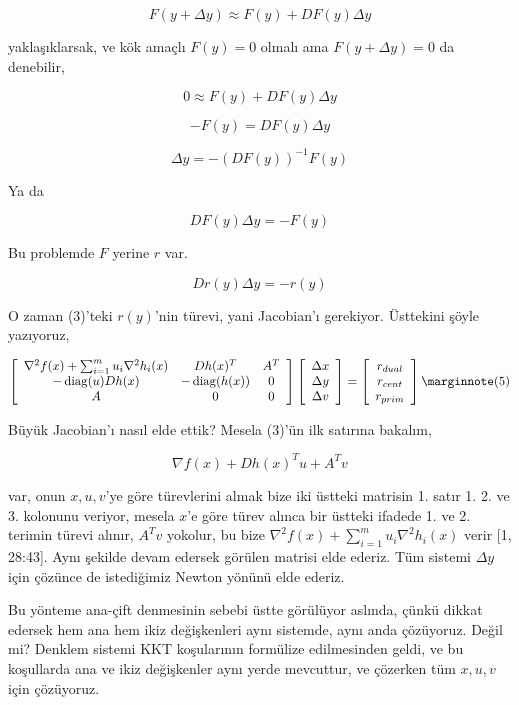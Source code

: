 \documentclass[12pt,fleqn]{article}\usepackage{../../common}
\begin{document}
$$
F(y + \Delta y) \approx F(y) + D F(y) \Delta y
$$

yaklaşıklarsak, ve kök amaçlı $F(y)=0$ olmalı ama $F(y + \Delta y) = 0$ da
denebilir,

$$
0 \approx F(y) + D F(y) \Delta y
$$

$$
-F(y) =  D F(y) \Delta y
$$

$$
\Delta y = -(DF(y))^{-1} F(y) 
$$

Ya da

$$
DF(y) \Delta y = -F(y) 
$$

Bu problemde $F$ yerine $r$ var. 

$$
D r(y) \Delta y = -r(y) 
$$

O zaman (3)'teki $r(y)$'nin türevi, yani Jacobian'ı gerekiyor. Üsttekini
şöyle yazıyoruz, 

$$
\left[\begin{array}{ccc}
\nabla^2 f(x) + \sum_{i=1}^{m} u_i \nabla^2 h_i(x) & D h(x)^T & A^T \\
-\diag(u) D h(x) & -\diag(h(x)) & 0 \\
A & 0 & 0
\end{array}\right]
\left[\begin{array}{c}
\Delta x \\ \Delta y \\ \Delta v
\end{array}\right] = 
\left[\begin{array}{c}
r_{dual} \\ r_{cent} \\ r_{prim}
\end{array}\right]  
\mlabel{5}
$$

Büyük Jacobian'ı nasıl elde ettik? Mesela (3)'ün ilk satırına bakalım, 

$$
\nabla f(x) + Dh(x)^T u + A^T v 
$$

var, onun $x,u,v$'ye göre türevlerini almak bize iki üstteki matrisin
1. satır 1. 2. ve 3. kolonunu veriyor, mesela $x$'e göre türev alınca bir
üstteki ifadede 1. ve 2. terimin türevi alınır, $A^T v $ yokolur, bu bize
$\nabla^2 f(x) + \sum_{i=1}^{m} u_i \nabla^2 h_i(x)$ verir [1, 28:43].
Aynı şekilde devam edersek görülen matrisi elde ederiz. Tüm sistemi
$\Delta y$ için çözünce de istediğimiz Newton yönünü elde ederiz.

Bu yönteme ana-çift denmesinin sebebi üstte görülüyor aslında, çünkü dikkat
edersek hem ana hem ikiz değişkenleri aynı sistemde, aynı anda
çözüyoruz. Değil mi? Denklem sistemi KKT koşularının formülize edilmesinden
geldi, ve bu koşullarda ana ve ikiz değişkenler aynı yerde mevcuttur, ve
çözerken tüm $x,u,v$ için çözüyoruz. 
\end{document}
